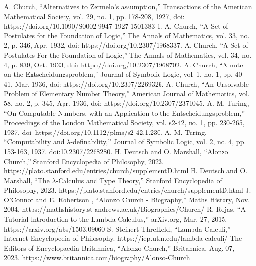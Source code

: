 \documentclass[letterpaper, 10 pt, conference]{ieeeconf}  %
\begin{document}
\addtolength{\textheight}{-12cm}   %
\begin{thebibliography}{99}

 A. Church, “Alternatives to Zermelo's assumption,” Transactions of the American Mathematical Society, vol. 29, no. 1, pp. 178-208, 1927, doi: https://doi.org/10.1090/S0002-9947-1927-1501383-1.
 A. Church, “A Set of Postulates for the Foundation of Logic,” The Annals of Mathematics, vol. 33, no. 2, p. 346, Apr. 1932, doi: https://doi.org/10.2307/1968337.
 A. Church, “A Set of Postulates For the Foundation of Logic,” The Annals of Mathematics, vol. 34, no. 4, p. 839, Oct. 1933, doi: https://doi.org/10.2307/1968702.
 A. Church, “A note on the Entscheidungsproblem,” Journal of Symbolic Logic, vol. 1, no. 1, pp. 40-41, Mar. 1936, doi: https://doi.org/10.2307/2269326.
 A. Church, “An Unsolvable Problem of Elementary Number Theory,” American Journal of Mathematics, vol. 58, no. 2, p. 345, Apr. 1936, doi: https://doi.org/10.2307/2371045.
 A. M. Turing, “On Computable Numbers, with an Application to the Entscheidungsproblem,” Proceedings of the London Mathematical Society, vol. s2-42, no. 1, pp. 230-265, 1937, doi: https://doi.org/10.1112/plms/s2-42.1.230.
 A. M. Turing, “Computability and $\lambda$-definability,” Journal of Symbolic Logic, vol. 2, no. 4, pp. 153-163, 1937. doi:10.2307/2268280.
 H. Deutsch and O. Marshall, “Alonzo Church,” Stanford Encyclopedia of Philosophy, 2023. https://plato.stanford.edu/entries/church/supplementD.html
 H. Deutsch and O. Marshall, “The $\lambda$-Calculus and Type Theory,” Stanford Encyclopedia of Philosophy, 2023. https://plato.stanford.edu/entries/church/supplementD.html
 J. O'Connor and E. Robertson , “Alonzo Church - Biography,” Maths History, Nov. 2004. https://mathshistory.st-andrews.ac.uk/Biographies/Church/
 R. Rojas, “A Tutorial Introduction to the Lambda Calculus,” arXiv.org, Mar. 27, 2015. https://arxiv.org/abs/1503.09060
 S. Steinert-Threlkeld, “Lambda Calculi,” Internet Encyclopedia of Philosophy. https://iep.utm.edu/lambda-calculi/
 The Editors of Encyclopaedia Britannica, “Alonzo Church,” Britannica, Aug. 07, 2023. https://www.britannica.com/biography/Alonzo-Church

\end{thebibliography}
\end{document}
